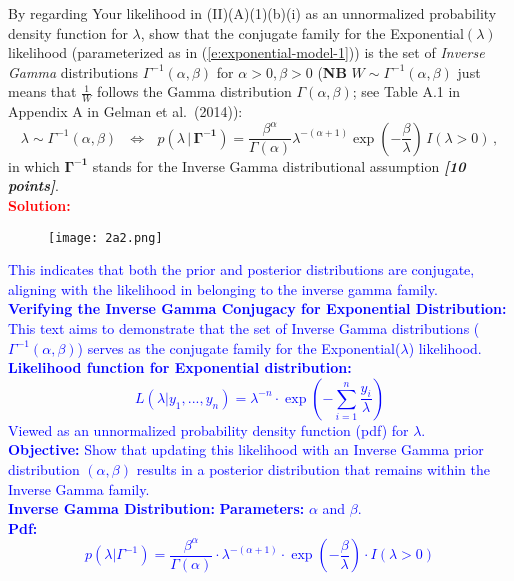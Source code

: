 \documentclass[12pt]{article}
\newcommand{\given}{\, | \,}
\newcommand{\bi}[1]{\b{\i{#1}}}
\renewcommand{\b}[1]{\textbf{#1}}
\renewcommand{\i}[1]{\textit{#1}}
\begin{document}
\begin{itemize}
\begin{itemize}
By regarding Your likelihood in (II)(A)(1)(b)(i) as an unnormalized probability density function for $\lambda$, show that the conjugate family for the Exponential$( \lambda )$ likelihood (parameterized as in (\ref{e:exponential-model-1})) is the set of \textit{Inverse Gamma} distributions $\Gamma^{ -1 } ( \alpha, \beta )$ for $\alpha > 0, \beta > 0$ (\textbf{NB} $W \sim \Gamma^{ -1 } ( \alpha, \beta )$ just means that $\frac{ 1 }{ W }$ follows the Gamma distribution $\Gamma ( \alpha, \beta )$; see Table A.1 in Appendix A in Gelman et al.~(2014)):
\begin{equation} \label{e:inverse-gamma-1}
\lambda \sim \Gamma^{ -1 } ( \alpha, \beta ) \ \ \ \iff \ \ \ p ( \lambda \given \bm{ \Gamma^{ -1 } } ) = \frac{ \beta^\alpha }{ \Gamma ( \alpha ) }
\lambda^{ - ( \alpha + 1 ) } \exp \left( - \frac{ \beta }{ \lambda } \right) \, I ( \lambda > 0 ) \, ,
\end{equation}
in which $\bm{ \Gamma^{ -1 } }$ stands for the Inverse Gamma distributional assumption \bi{[10 points]}.
\\ \textcolor{red}{\textbf{Solution:}} \\
\begin{figure}[h]
    \centering
    \texttt{[image: 2a2.png]}
\end{figure}
\textcolor{blue}{This indicates that both the prior and posterior distributions are conjugate, aligning with the likelihood in belonging to the inverse gamma family.} \\
\textcolor{blue}{\textbf{Verifying the Inverse Gamma Conjugacy for Exponential Distribution:}
This text aims to demonstrate that the set of Inverse Gamma distributions ($\Gamma^{-1} (\alpha,\beta)$) serves as the conjugate family for the Exponential($\lambda$) likelihood. \\
\textbf{Likelihood function for Exponential distribution:}
\[ L(\lambda|y_1, ..., y_n) = \lambda^{-n} \cdot \exp\left(-\sum_{i=1}^{n} \frac{y_i}{\lambda}\right) \]
Viewed as an unnormalized probability density function (pdf) for $\lambda$. \\
\textbf{Objective:}
Show that updating this likelihood with an Inverse Gamma prior distribution $(\alpha, \beta)$ results in a posterior distribution that remains within the Inverse Gamma family. \\
\textbf{Inverse Gamma Distribution:}
\textbf{Parameters:} $\alpha$ and $\beta$. \\
\textbf{Pdf:}
\[ p(\lambda | \Gamma^{-1}) = \frac{\beta^{\alpha}}{\Gamma(\alpha)} \cdot \lambda^{-(\alpha+1)} \cdot \exp\left(-\frac{\beta}{\lambda}\right) \cdot I(\lambda > 0) \]
}
\end{itemize}
\end{itemize}
\end{document}
